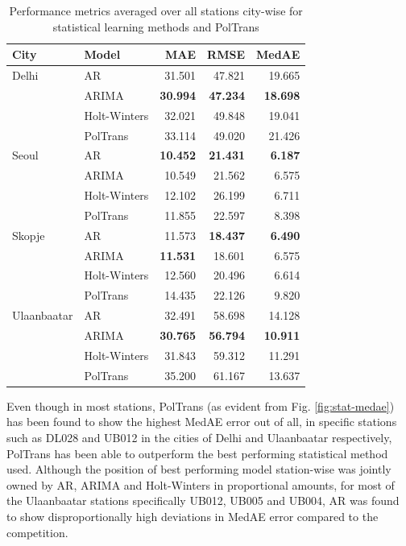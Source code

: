 \documentclass[10pt,journal]{IEEEtran}
\begin{document}
\begin{table}[h]
\small
\centering
\tabcolsep=0.16cm
\caption{Performance metrics averaged over all stations city-wise for statistical learning methods and PolTrans}
\label{tbl:stat-performance}
\begin{tabular}{llrrr}
\toprule
City & Model & MAE & RMSE & MedAE \\
\midrule
Delhi & AR & 31.501 & 47.821 & 19.665 \\
& ARIMA & \textbf{30.994} & \textbf{47.234} & \textbf{18.698} \\
& Holt-Winters & 32.021 & 49.848 & 19.041 \\
& PolTrans & 33.114 & 49.020 & 21.426 \\
Seoul & AR & \textbf{10.452} & \textbf{21.431} & \textbf{6.187} \\
& ARIMA & 10.549 & 21.562 & 6.575 \\
& Holt-Winters & 12.102 & 26.199 & 6.711 \\
& PolTrans & 11.855 & 22.597 & 8.398 \\
Skopje & AR & 11.573 & \textbf{18.437} & \textbf{6.490} \\
& ARIMA & \textbf{11.531} & 18.601 & 6.575 \\
& Holt-Winters & 12.560 & 20.496 & 6.614 \\
& PolTrans & 14.435 & 22.126 & 9.820 \\
Ulaanbaatar & AR & 32.491 & 58.698 & 14.128 \\
& ARIMA & \textbf{30.765} & \textbf{56.794} & \textbf{10.911} \\
& Holt-Winters & 31.843 & 59.312 & 11.291 \\
& PolTrans & 35.200 & 61.167 & 13.637 \\
\bottomrule
\end{tabular}
\end{table}

Even though in most stations, {PolTrans} (as evident from Fig. \ref{fig:stat-medae}) has been found to show the highest MedAE error out of all, in specific stations such as DL028 and UB012 in the cities of Delhi and Ulaanbaatar respectively, {PolTrans} has been able to outperform the best performing statistical method used. Although the position of best performing model station-wise was jointly owned by AR, ARIMA and Holt-Winters in proportional amounts, for most of the Ulaanbaatar stations specifically UB012, UB005 and UB004, AR was found to show disproportionally high deviations in MedAE error compared to the competition.
\end{document}
